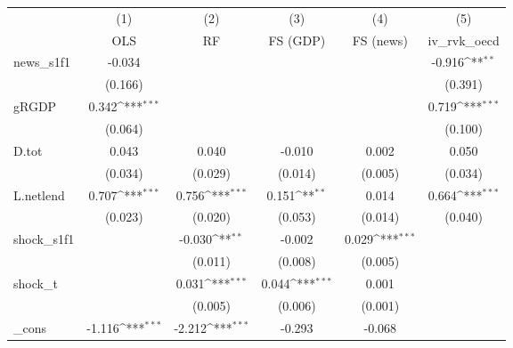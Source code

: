 {
\def\sym#1{\ifmmode^{#1}\else\(^{#1}\)\fi}
\begin{tabular}{l*{5}{c}}
\toprule
            &\multicolumn{1}{c}{(1)}&\multicolumn{1}{c}{(2)}&\multicolumn{1}{c}{(3)}&\multicolumn{1}{c}{(4)}&\multicolumn{1}{c}{(5)}\\
            &\multicolumn{1}{c}{OLS}&\multicolumn{1}{c}{RF}&\multicolumn{1}{c}{FS (GDP)}&\multicolumn{1}{c}{FS (news)}&\multicolumn{1}{c}{iv\_rvk\_oecd}\\
\midrule
news\_s1f1   &      -0.034         &                     &                     &                     &      -0.916\sym{**} \\
            &     (0.166)         &                     &                     &                     &     (0.391)         \\
\addlinespace
gRGDP       &       0.342\sym{***}&                     &                     &                     &       0.719\sym{***}\\
            &     (0.064)         &                     &                     &                     &     (0.100)         \\
\addlinespace
D.tot       &       0.043         &       0.040         &      -0.010         &       0.002         &       0.050         \\
            &     (0.034)         &     (0.029)         &     (0.014)         &     (0.005)         &     (0.034)         \\
\addlinespace
L.netlend   &       0.707\sym{***}&       0.756\sym{***}&       0.151\sym{**} &       0.014         &       0.664\sym{***}\\
            &     (0.023)         &     (0.020)         &     (0.053)         &     (0.014)         &     (0.040)         \\
\addlinespace
shock\_s1f1  &                     &      -0.030\sym{**} &      -0.002         &       0.029\sym{***}&                     \\
            &                     &     (0.011)         &     (0.008)         &     (0.005)         &                     \\
\addlinespace
shock\_t     &                     &       0.031\sym{***}&       0.044\sym{***}&       0.001         &                     \\
            &                     &     (0.005)         &     (0.006)         &     (0.001)         &                     \\
\addlinespace
\_cons      &      -1.116\sym{***}&      -2.212\sym{***}&      -0.293         &      -0.068         &                     \\

\end{tabular}}
